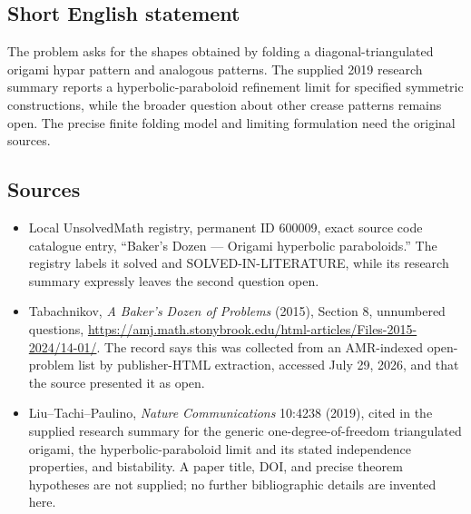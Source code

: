 \documentclass[11pt]{article}
\begin{document}
\subsection{Short English statement}
The problem asks for the shapes obtained by folding a diagonal-triangulated origami hypar pattern and analogous patterns. The supplied 2019 research summary reports a hyperbolic-paraboloid refinement limit for specified symmetric constructions, while the broader question about other crease patterns remains open. The precise finite folding model and limiting formulation need the original sources.
\subsection{Sources}
\begin{itemize}
\item Local UnsolvedMath registry, permanent ID 600009, exact source code catalogue entry, ``Baker's Dozen --- Origami hyperbolic paraboloids.'' The registry labels it solved and SOLVED-IN-LITERATURE, while its research summary expressly leaves the second question open.
\item Tabachnikov, \emph{A Baker's Dozen of Problems} (2015), Section 8, unnumbered questions, \url{https://amj.math.stonybrook.edu/html-articles/Files-2015-2024/14-01/}. The record says this was collected from an AMR-indexed open-problem list by publisher-HTML extraction, accessed July 29, 2026, and that the source presented it as open.
\item Liu--Tachi--Paulino, \emph{Nature Communications} 10:4238 (2019), cited in the supplied research summary for the generic one-degree-of-freedom triangulated origami, the hyperbolic-paraboloid limit and its stated independence properties, and bistability. A paper title, DOI, and precise theorem hypotheses are not supplied; no further bibliographic details are invented here.
\end{itemize}
\end{document}
